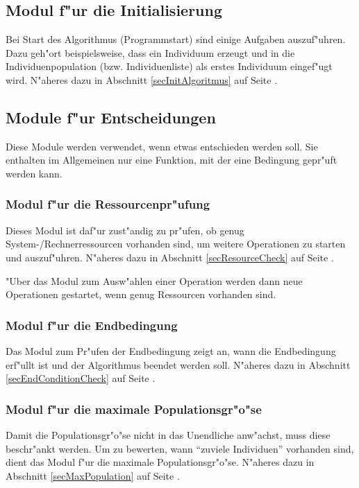 \subsection{Modul f"ur die Initialisierung}

Bei Start des Algorithmus (Programmstart) sind einige Aufgaben auszuf"uhren. Dazu geh"ort beispielsweise, dass ein Individuum erzeugt und in die Individuenpopulation (bzw. Individuenliste) als erstes Individuum eingef"ugt wird. N"aheres dazu in Abschnitt \ref{secInitAlgoritmus} auf Seite \pageref{secInitAlgoritmus}.


\subsection{Module f"ur Entscheidungen}

Diese Module werden verwendet, wenn etwas entschieden werden soll. Sie enthalten im Allgemeinen nur eine Funktion, mit der eine Bedingung gepr"uft werden kann.


\subsubsection{Modul f"ur die Ressourcenpr"ufung}

Dieses Modul ist daf"ur zust"andig zu pr"ufen, ob genug System-/Rechnerressourcen vorhanden sind, um weitere Operationen zu starten und auszuf"uhren. N"aheres dazu in Abschnitt \ref{secResourceCheck} auf Seite \pageref{secResourceCheck}.

"Uber das Modul zum Ausw"ahlen einer Operation werden dann neue Operationen gestartet, wenn genug Ressourcen vorhanden sind.


\subsubsection{Modul f"ur die Endbedingung}

Das Modul zum Pr"ufen der Endbedingung zeigt an, wann die Endbedingung erf"ullt ist und der Algorithmus beendet werden soll. N"aheres dazu in Abschnitt \ref{secEndConditionCheck} auf Seite \pageref{secEndConditionCheck}.


\subsubsection{Modul f"ur die maximale Populationsgr"o"se}

Damit die Populationsgr"o"se nicht in das Unendliche anw"achst, muss diese beschr"ankt werden. Um zu bewerten, wann ``zuviele Individuen'' vorhanden sind, dient das Modul f"ur die maximale Populationsgr"o"se. N"aheres dazu in Abschnitt \ref{secMaxPopulation} auf Seite \pageref{secMaxPopulation}.

